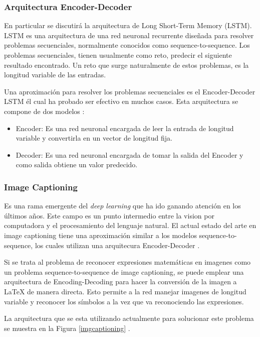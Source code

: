   
    \subsubsection{Arquitectura Encoder-Decoder}
    
    En particular se discutirá la arquitectura de Long Short-Term Memory (LSTM). LSTM es una arquitectura de una red neuronal recurrente diseñada para resolver problemas secuenciales, normalmente conocidos como sequence-to-sequence. Los problemas secuenciales, tienen usualmente como reto, predecir el siguiente resultado encontrado. Un reto que surge naturalmente de estos problemas, es la longitud variable de las entradas.
    
    Una aproximación para resolver los problemas secuenciales es el Encoder-Decoder LSTM él cual ha probado ser efectivo en muchos casos. Esta arquitectura se compone de dos modelos \cite{encoderDecoder}:
    
    \begin{itemize}
    	\item Encoder: Es una red neuronal encargada de leer la entrada de longitud variable y convertirla en un vector de longitud fija.
    	\item Decoder: Es una red neuronal encargada de tomar la salida del Encoder y como salida obtiene un valor predecido.
    \end{itemize} 


	\subsubsection{Image Captioning}
    
    Es una rama emergente del \textit{deep learning} que ha ido ganando atención en los últimos años. Este campo es un punto intermedio entre la vision por computadora y el procesamiento del lenguaje natural. El actual estado del arte en image captioning tiene una aproximación similar a los modelos sequence-to-sequence, los cuales utilizan una arquitecura Encoder-Decoder \cite{imagetolatex}.
    
    Si se trata al problema de reconocer expresiones matemáticas en imagenes como un problema sequence-to-sequence de image captioning, se puede emplear una arquitectura de Encoding-Decoding para hacer la conversión de la imagen a LaTeX de manera directa. Esto permite a la red manejar imagenes de longitud variable y reconocer los símbolos a la vez que va reconociendo las expresiones.
    
    La arquitectura que se esta utilizando actualmente para solucionar este problema se muestra en la Figura \ref{imgcaptioning} \cite{imagetolatex}\cite{imagemarkup}\cite{chino}.
    
